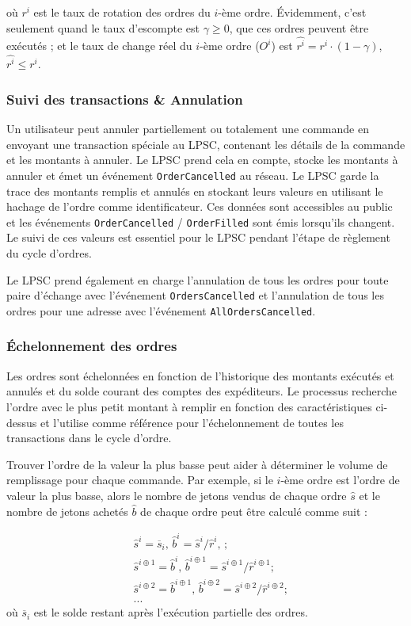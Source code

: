 \documentclass[UTF8,nofonts]{article}
\begin{document}
\begin{multicols}{2}
où $r^i$ est le taux de rotation des ordres du $i$-ème ordre. Évidemment, c’est seulement quand le taux d'escompte est $\gamma\ge 0$, que ces ordres peuvent être exécutés ; et le taux de change réel du $i$-ème ordre ($O^i$) est $\hat{r^i} = r^i \cdot (1-\gamma)$, $\hat{r^i}\le r^i$.


\subsubsection{Suivi des transactions \& Annulation}

Un utilisateur peut annuler partiellement ou totalement une commande en envoyant une transaction spéciale au LPSC, contenant les détails de la commande et les montants à annuler. Le LPSC prend cela en compte, stocke les montants à annuler et émet un événement \verb|OrderCancelled| au réseau. Le LPSC garde la trace des montants remplis et annulés en stockant leurs valeurs en utilisant le hachage de l'ordre comme identificateur. Ces données sont accessibles au public et les événements \verb|OrderCancelled| / \verb|OrderFilled| sont émis lorsqu'ils changent. Le suivi de ces valeurs est essentiel pour le LPSC pendant l'étape de règlement du cycle d'ordres.

Le LPSC prend également en charge l'annulation de tous les ordres pour toute paire d’échange avec l'événement \verb|OrdersCancelled| et l'annulation de tous les ordres pour une adresse avec l'événement \verb|AllOrdersCancelled|.


\subsubsection{Échelonnement des ordres\label{sec:order_scaling}}
Les ordres sont échelonnées en fonction de l'historique des montants exécutés et annulés et du solde courant des comptes des expéditeurs. Le processus recherche l'ordre avec le plus petit montant à remplir en fonction des caractéristiques ci-dessus et l'utilise comme référence pour l'échelonnement de toutes les transactions dans le cycle d'ordre.


Trouver l'ordre de la valeur la plus basse peut aider à déterminer le volume de remplissage pour chaque commande. Par exemple, si le $i$-ème ordre est l'ordre de valeur la plus basse, alors le nombre de jetons vendus de chaque ordre $\hat{s}$ et le nombre de jetons achetés $\hat{b}$ de chaque ordre peut être calculé comme suit :

\[
\begin{split}
&\hat{s}^{i}=\overline{s}_i\text{, } \hat{b}^{i}=\hat{s}^{i}/ \hat{r}^i\text{, }\text{;}\\
&\hat{s}^{i\oplus 1}=\hat{b}^i\text{, } \hat{b}^{i\oplus 1}=\hat{s}^{i\oplus 1}/ \hat{r}^{i\oplus 1}\text{;}\\
&\hat{s}^{i\oplus 2}=\hat{b}^{i\oplus 1}\text{, } \hat{b}^{i\oplus 2}=\hat{s}^{i\oplus 2}/ \hat{r}^{i\oplus 2}\text{;}\\
& ...
\end{split}
\]
où $\overline{s}_i$ est le solde restant après l'exécution partielle des ordres.


\end{multicols}
\end{document}
